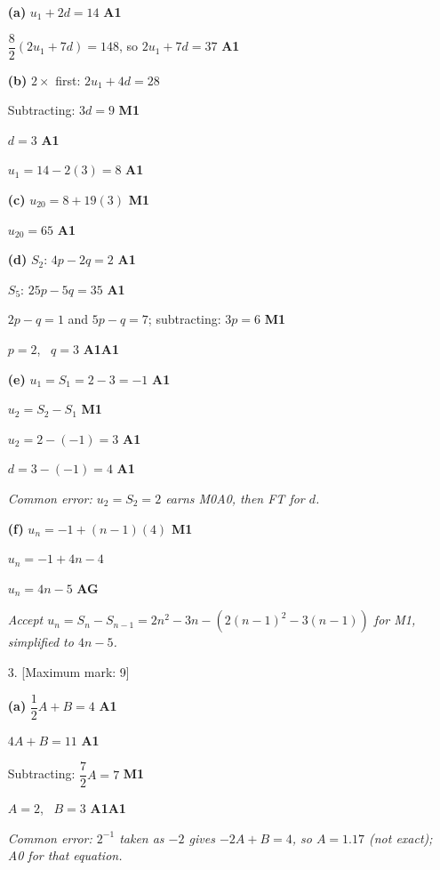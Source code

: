 \documentclass[12pt, twoside]{article}
\begin{document}
\begin{enumerate}[itemsep=0.3cm]
\textbf{(a)} $u_{1} + 2d = 14$ \hfill \textbf{A1}

$\dfrac{8}{2}\left(2u_{1} + 7d\right) = 148$, so $2u_{1} + 7d = 37$
\hfill \textbf{A1}

\textbf{(b)} $2 \times$ first: $2u_{1} + 4d = 28$

Subtracting: $3d = 9$ \hfill \textbf{M1}

$d = 3$ \hfill \textbf{A1}

$u_{1} = 14 - 2(3) = 8$ \hfill \textbf{A1}

\textbf{(c)} $u_{20} = 8 + 19(3)$ \hfill \textbf{M1}

$u_{20} = 65$ \hfill \textbf{A1}

\textbf{(d)} $S_{2}$: $4p - 2q = 2$ \hfill \textbf{A1}

$S_{5}$: $25p - 5q = 35$ \hfill \textbf{A1}

$2p - q = 1$ and $5p - q = 7$; subtracting: $3p = 6$ \hfill \textbf{M1}

$p = 2$, \ $q = 3$ \hfill \textbf{A1A1}

\textbf{(e)} $u_{1} = S_{1} = 2 - 3 = -1$ \hfill \textbf{A1}

$u_{2} = S_{2} - S_{1}$ \hfill \textbf{M1}

$u_{2} = 2 - (-1) = 3$ \hfill \textbf{A1}

$d = 3 - (-1) = 4$ \hfill \textbf{A1}

\emph{Common error: $u_{2} = S_{2} = 2$ earns M0A0, then FT for $d$.}

\textbf{(f)} $u_{n} = -1 + (n - 1)(4)$ \hfill \textbf{M1}

$u_{n} = -1 + 4n - 4$

$u_{n} = 4n - 5$ \hfill \textbf{AG}

\emph{Accept $u_{n} = S_{n} - S_{n-1} = 2n^{2} - 3n - \left(2(n - 1)^{2}
- 3(n - 1)\right)$ for M1, simplified to $4n - 5$.}

\newpage

\item[3.] [Maximum mark: 9]

\textbf{(a)} $\dfrac{1}{2}A + B = 4$ \hfill \textbf{A1}

$4A + B = 11$ \hfill \textbf{A1}

Subtracting: $\dfrac{7}{2}A = 7$ \hfill \textbf{M1}

$A = 2$, \ $B = 3$ \hfill \textbf{A1A1}

\emph{Common error: $2^{-1}$ taken as $-2$ gives $-2A + B = 4$, so
$A = 1.17$ (not exact); A0 for that equation.}


\end{enumerate}
\end{document}
